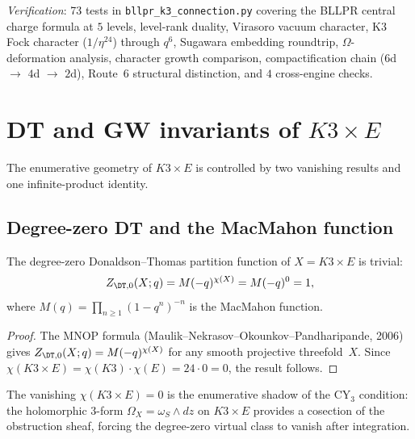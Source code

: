 \noindent\textit{Verification}: 73 tests in \texttt{bllpr\_k3\_connection.py} covering the BLLPR central charge formula at $5$ levels, level-rank duality, Virasoro vacuum character, K3 Fock character ($1/\eta^{24}$) through $q^6$, Sugawara embedding roundtrip, $\Omega$-deformation analysis, character growth comparison, compactification chain ($6$d $\to$ $4$d $\to$ $2$d), Route~$6$ structural distinction, and $4$ cross-engine checks.



\section{DT and GW invariants of $K3 \times E$}
\label{sec:k3e-dt-gw}

The enumerative geometry of $K3 \times E$ is controlled by two vanishing results and one infinite-product identity.

\subsection{Degree-zero DT and the MacMahon function}
\label{subsec:k3e-dt-degree0}

\begin{theorem}
\label{thm:k3e-dt-degree0}
\ClaimStatusProvedElsewhere
The degree-zero Donaldson--Thomas partition function of $X = K3 \times E$ is trivial:
\[
 Z_{\DT,0}(X; q) = M(-q)^{\chi(X)} = M(-q)^0 = 1,
\]
where $M(q) = \prod_{n \geq 1}(1 - q^n)^{-n}$ is the MacMahon function.
\ClaimStatusProvedElsewhere
\end{theorem}

\begin{proof}
The MNOP formula (Maulik--Nekrasov--Okounkov--Pandharipande, 2006) gives $Z_{\DT,0}(X; q) = M(-q)^{\chi(X)}$ for any smooth projective threefold~$X$. Since $\chi(K3 \times E) = \chi(K3) \cdot \chi(E) = 24 \cdot 0 = 0$, the result follows.
\end{proof}

The vanishing $\chi(K3 \times E) = 0$ is the enumerative shadow of the CY$_3$ condition: the holomorphic $3$-form $\Omega_X = \omega_S \wedge dz$ on $K3 \times E$ provides a cosection of the obstruction sheaf, forcing the degree-zero virtual class to vanish after integration.

